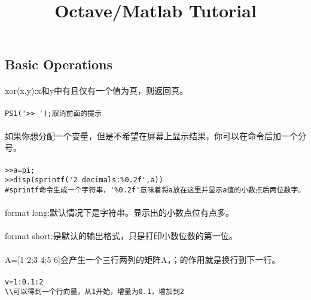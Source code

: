 \documentclass{article}
\begin{document}
\begin{CJK}{UTF8}{gbsn}
\title{Octave/Matlab Tutorial}
\date{}
\maketitle
\section{Basic Operations}
\paragraph{}
xor(x,y):x和y中有且仅有一个值为真，则返回真。
\paragraph{}
\begin{verbatim}
PS1('>> ');取消前面的提示
\end{verbatim}
\paragraph{}
如果你想分配一个变量，但是不希望在屏幕上显示结果，你可以在命令后加一个分号。
\paragraph{}
\begin{verbatim}
>>a=pi;
>>disp(sprintf('2 decimals:%0.2f',a))
#sprintf命令生成一个字符串，'%0.2f'意味着将a放在这里并显示a值的小数点后两位数字。
\end{verbatim}
\paragraph{}
format long:默认情况下是字符串。显示出的小数点位有点多。
\paragraph{}
format short:是默认的输出格式，只是打印小数位数的第一位。
\paragraph{}
A=[1 2;3 4;5 6]会产生一个三行两列的矩阵A，；的作用就是换行到下一行。
\paragraph{}
\begin{verbatim}
v=1:0.1:2
\\可以得到一个行向量，从1开始，增量为0.1，增加到2
\end{verbatim}

\end{CJK}
\end{document}
